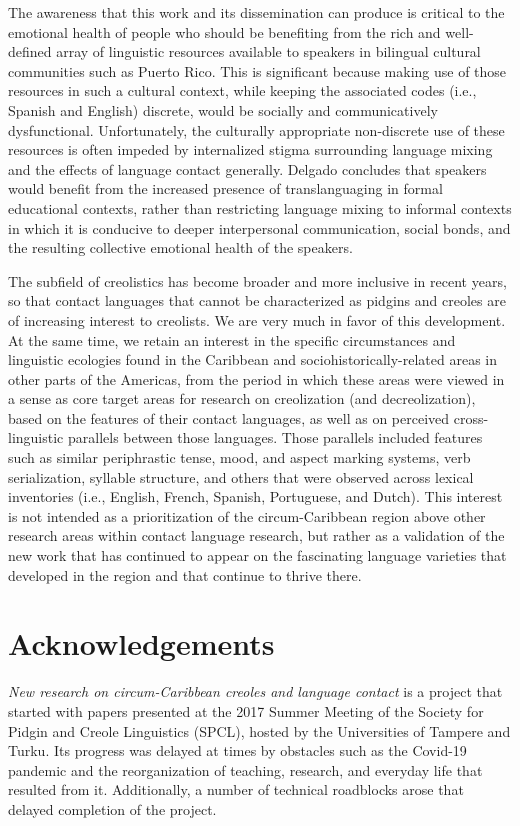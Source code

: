 \documentclass[output=paper,colorlinks,citecolor=brown]{langscibook}
\begin{document}
The awareness that this work and its dissemination can produce is critical to the emotional health of people who should be benefiting from the rich and well-defined array of linguistic resources available to speakers in bilingual cultural communities such as Puerto Rico. This is significant because making use of those resources in such a cultural context, while keeping the associated codes (i.e., Spanish and English) discrete, would be socially and communicatively dysfunctional. Unfortunately, the culturally appropriate non-discrete use of these resources is often impeded by internalized stigma surrounding language mixing and the effects of language contact generally. Delgado concludes that speakers would benefit from the increased presence of translanguaging in formal educational contexts, rather than restricting language mixing to informal contexts in which it is conducive to deeper interpersonal communication, social bonds, and the resulting collective emotional health of the speakers.

The subfield of creolistics has become broader and more inclusive in recent years, so that contact languages that cannot be characterized as pidgins and creoles are of increasing interest to creolists. We are very much in favor of this development. At the same time, we retain an interest in the specific circumstances and linguistic ecologies found in the Caribbean and sociohistorically-related areas in other parts of the Americas, from the period in which these areas were viewed in a sense as core target areas for research on creolization (and decreolization), based on the features of their contact languages, as well as on perceived cross-linguistic parallels between those languages. Those parallels included features such as similar periphrastic tense, mood, and aspect marking systems, verb serialization, syllable structure, and others that were observed across lexical inventories (i.e., English, French, Spanish, Portuguese, and Dutch). This interest is not intended as a prioritization of the circum-Caribbean region above other research areas within contact language research, but rather as a validation of the new work that has continued to appear on the fascinating language varieties that developed in the region and that continue to thrive there.

\section*{Acknowledgements}
\emph{New research on circum-Caribbean creoles and language contact} is a project that started with papers presented at the 2017 Summer Meeting of the Society for Pidgin and Creole Linguistics (SPCL), hosted by the Universities of Tampere and Turku. Its progress was delayed at times by obstacles such as the Covid-19 pandemic and the reorganization of teaching, research, and everyday life that resulted from it. Additionally, a number of technical roadblocks arose that delayed completion of the project.
\end{document}
